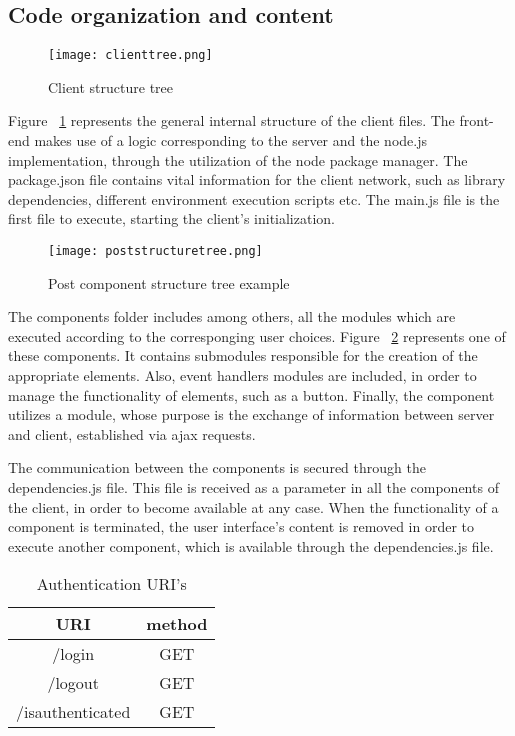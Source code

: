 \subsection{Code organization and content}
\begin{figure}
	\texttt{[image: clienttree.png]}
	\caption{Client structure tree}
	\label{clienttree}
\end{figure}
Figure ~\ref{clienttree} represents the general internal structure of the client files. The front-end makes use of a logic corresponding to the server and the node.js implementation, through the utilization of the node package manager. The package.json file contains vital information for the client network, such as library dependencies, different environment execution scripts etc. The main.js file is the first file to execute, starting the client's initialization. \par 
\begin{figure}
	\texttt{[image: poststructuretree.png]}
	\caption{Post component structure tree example}
	\label{poststructuretree}
\end{figure}
	The components folder includes among others, all the modules which are executed according to the corresponging user choices. Figure ~\ref{poststructuretree} represents one of these components. It contains submodules responsible for the creation of the appropriate elements. Also, event handlers modules are included, in order to manage the functionality of elements, such as a button. Finally, the component utilizes a module, whose purpose is the exchange of information between server and client, established via ajax requests.\par
	The communication between the components is secured through the dependencies.js file. This file is received as a parameter in all the components of the client, in order to become available at any case. When the functionality of a component is terminated, the user interface's content is removed in order to execute another component, which is available through the dependencies.js file.


\begin{table}[]
\centering
\begin{tabular}{|c|c|}
\hline
\rowcolor[HTML]{32CB00} 
\textbf{URI}     & \textbf{method} \\ \hline
\rowcolor[HTML]{FFFFFF} 
/login           & GET             \\ \hline
\rowcolor[HTML]{67FD9A} 
/logout          & GET             \\ \hline
\rowcolor[HTML]{FFFFFF} 
/isauthenticated & GET             \\ \hline
\end{tabular}
\caption{Authentication URI's}
\label{authURI}
\end{table}


